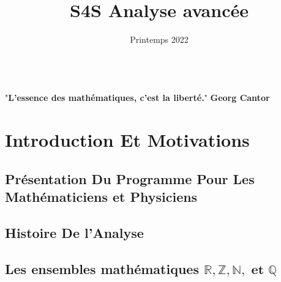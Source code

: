 \documentclass[11pt]{report}
\title{S4S Analyse avancée }
\author{ }
\date{Printemps 2022}
\begin{document}
\layout
\maketitle
\newcommand{\bcks}[1]{\textbackslash{}}
\newcommand{\R}[2]{ $\mathbb{R}$ }





\\ 
 
 "\textbf{L'essence des mathématiques, c'est la liberté.}" \textbf{Georg Cantor}
 
 \paragraph{}
 


\paragraph{}
\paragraph{}


\renewcommand{\contentsname}{Sommaire} 
\setcounter{tocdepth}{1}
\tableofcontents
\chapter{Introduction Et Motivations}
\section{Présentation Du Programme Pour Les Mathématiciens et Physiciens}
\lipsum[1]
\section{Histoire De l'Analyse}
\lipsum[1]
\section{Les ensembles mathématiques $\mathbf{\mathbb{R},\mathbb{Z},\mathbb{N}, \text{ et }  \mathbb{Q}}$}
\end{document}
